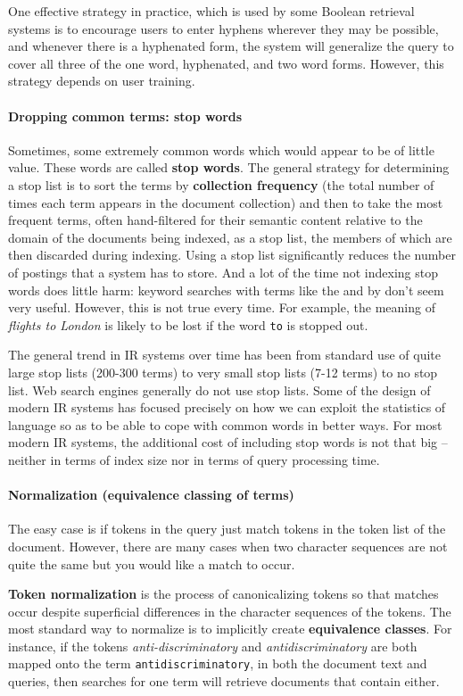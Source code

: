 \documentclass[letterpaper,11pt]{article}
\newcommand{\code}[1]{\texttt{#1}}
\begin{document}
One effective strategy in practice, which is used by some Boolean retrieval systems is to encourage users to enter hyphens wherever they may be possible, and whenever there is a hyphenated form, the system will generalize the query to cover all three of the one word, hyphenated, and two word forms. However, this strategy depends on user training.

\paragraph{Dropping common terms: stop words}
Sometimes, some extremely common words which would appear to be of little value. These words are called \textbf{stop words}. The general strategy for determining a stop list is to sort the terms by \textbf{collection frequency} (the total number of times each term appears in the document collection) and then to take the most frequent terms, often hand-filtered for their semantic content relative to the domain of the documents being indexed, as a stop list, the members of which are then discarded during indexing. Using a stop list significantly reduces the number of postings that a system has to store. And a lot of the time not indexing stop words does little harm: keyword searches with terms like the and by don't seem very useful. However, this is not true every time. For example, the meaning of \textit{flights to London} is likely to be lost if the word \code{to} is stopped out.

The general trend in IR systems over time has been from standard use of quite large stop lists (200-300 terms) to very small stop lists (7-12 terms) to no stop list. Web search engines generally do not use stop lists. Some of the design of modern IR systems has focused precisely on how we can exploit the statistics of language so as to be able to cope with common words in better ways. For most modern IR systems, the additional cost of including stop words is not that big – neither in terms of index size nor in terms of query processing time.

\paragraph{Normalization (equivalence classing of terms)}
The easy case is if tokens in the query just match tokens in the token list of the document. However, there are many cases when two character sequences are not quite the same but you would like a match to occur.

\textbf{Token normalization} is the process of canonicalizing tokens so that matches occur despite superficial differences in the character sequences of the tokens. The most standard way to normalize is to implicitly create \textbf{equivalence classes}. For instance, if the tokens \textit{anti-discriminatory} and \textit{antidiscriminatory} are both mapped onto the term \code{antidiscriminatory}, in both the document text and queries, then searches for one term will retrieve documents that contain either.
\end{document}
